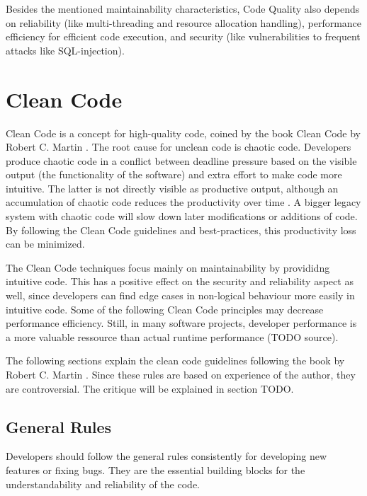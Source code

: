 Besides the mentioned maintainability characteristics, Code Quality also depends on reliability (like multi-threading and resource allocation handling), performance efficiency for efficient code execution, and security (like vulnerabilities to frequent attacks like SQL-injection).

\section{Clean Code}
Clean Code is a concept for high-quality code, coined by the book Clean Code by Robert C. Martin \cite{martin_clean_2009}. The root cause for unclean code is chaotic code. Developers produce chaotic code in a conflict between deadline pressure based on the visible output (the functionality of the software) and extra effort to make code more intuitive. The latter is not directly visible as productive output, although an accumulation of chaotic code reduces the productivity over time \cite{martin_clean_2009}. A bigger legacy system with chaotic code will slow down later modifications or additions of code. By following the Clean Code guidelines and best-practices, this productivity loss can be minimized. 

The Clean Code techniques focus mainly on maintainability by provididng intuitive code. This has a positive effect on the security and reliability aspect as well, since developers can find edge cases in non-logical behaviour more easily in intuitive code. Some of the following Clean Code principles may decrease performance efficiency. Still, in many software projects, developer performance is a more valuable ressource than actual runtime performance (TODO source).


The following sections explain the clean code guidelines following the book by Robert C. Martin \cite{martin_clean_2009}.
Since these rules are based on experience of the author, they are controversial. The critique will be explained in section TODO.

\subsection{General Rules}
Developers should follow the general rules consistently for developing new features or fixing bugs. They are the essential building blocks for the understandability and reliability of the code. 

